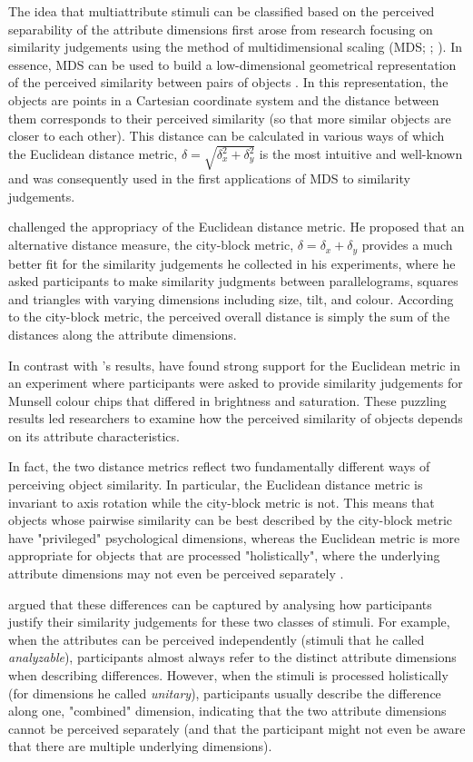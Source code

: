 \documentclass[11pt,a4paper]{article}
\begin{document}
The idea that multiattribute stimuli can be classified based on the perceived separability of the attribute dimensions first arose from research focusing on similarity judgements using the method of multidimensional scaling (MDS; ; ). In essence, MDS can be used to build a low-dimensional geometrical representation of the perceived similarity between pairs of objects \cite{Hout2013}. In this representation, the objects are points in a Cartesian coordinate system and the distance between them corresponds to their perceived similarity (so that more similar objects are closer to each other). This distance can be calculated in various ways of which the Euclidean distance metric, $\delta = \sqrt{\delta_x^2 + \delta_y^2} $ is the most intuitive and well-known and was consequently used in the first applications of MDS to similarity judgements.

 challenged the appropriacy of the Euclidean distance metric. He proposed that an alternative distance measure, the city-block metric, $\delta = \delta_x + \delta_y $ provides a much better fit for the similarity judgements he collected in his experiments, where he asked participants to make similarity judgments between parallelograms, squares and triangles with varying dimensions including size, tilt, and colour. According to the city-block metric, the perceived overall distance is simply the sum of the distances along the attribute dimensions.  

In contrast with \citeauthor{Attneave1950}'s results,  have found strong support for the Euclidean metric in an experiment where participants were asked to provide similarity judgements for Munsell colour chips that differed in brightness and saturation. These puzzling results led researchers to examine how the perceived similarity of objects depends on its attribute characteristics. 

In fact, the two distance metrics reflect two fundamentally different ways of perceiving object similarity. In particular, the Euclidean distance metric is invariant to axis rotation while the city-block metric is not. This means that objects whose pairwise similarity can be best described by the city-block metric have "privileged" psychological dimensions, whereas the Euclidean metric is more appropriate for objects that are processed "holistically", where the underlying attribute dimensions may not even be perceived separately \cite{Shepp1989}. 

 argued that these differences can be captured by analysing how participants justify their similarity judgements for these two classes of stimuli. For example, when the attributes can be perceived independently (stimuli that he called \textit{analyzable}), participants almost always refer to the distinct attribute dimensions when describing differences. However, when the stimuli is processed holistically (for dimensions he called \textit{unitary}), participants usually describe the difference along one, "combined" dimension, indicating that the two attribute dimensions cannot be perceived separately (and that the participant might not even be aware that there are multiple underlying dimensions). 
\end{document}
